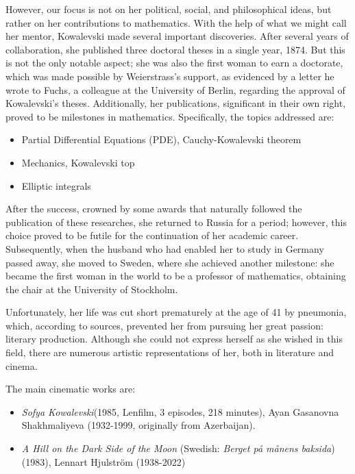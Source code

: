 However, our focus is not on her political, social, and philosophical ideas, but rather on her contributions to mathematics. With the help of what we might call her mentor, Kowalevski made several important discoveries. After several years of collaboration, she published three doctoral theses in a single year, 1874. But this is not the only notable aspect; she was also the first woman to earn a doctorate, which was made possible by Weierstrass's support, as evidenced by a letter he wrote to Fuchs, a colleague at the University of Berlin, regarding the approval of Kowalevski's theses. Additionally, her publications, significant in their own right, proved to be milestones in mathematics. Specifically, the topics addressed are:
\begin{itemize}
\item Partial Differential Equations (PDE), Cauchy-Kowalevski theorem
\item Mechanics, Kowalevski top
\item Elliptic integrals
\end{itemize}

After the success, crowned by some awards that naturally followed the publication of these researches, she returned to Russia for a period; however, this choice proved to be futile for the continuation of her academic career. Subsequently, when the husband who had enabled her to study in Germany passed away, she moved to Sweden, where she achieved another milestone: she became the first woman in the world to be a professor of mathematics, obtaining the chair at the University of Stockholm.

Unfortunately, her life was cut short prematurely at the age of 41 by pneumonia, which, according to sources, prevented her from pursuing her great passion: literary production. Although she could not express herself as she wished in this field, there are numerous artistic representations of her, both in literature and cinema.

The main cinematic works are:
\begin{itemize}
\emergencystretch 3em
\item \textit{Sofya Kowalevski}(1985, Lenfilm, 3 episodes, 218 minutes), Ayan Gasanovna Shakhmaliyeva (1932-1999, originally from Azerbaijan).

\item \textit{A Hill on the Dark Side of the Moon} (Swedish: \textit{Berget på månens baksida})(1983), Lennart Hjulström (1938-2022)
\end{itemize}

